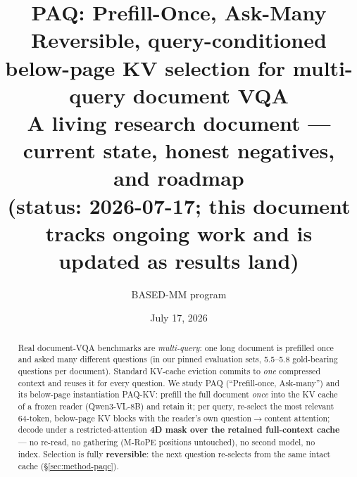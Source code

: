 \documentclass[11pt,letterpaper]{article}
\title{\textbf{PAQ: Prefill-Once, Ask-Many}\\[2mm]
\large Reversible, query-conditioned below-page KV selection for multi-query document VQA\\[1mm]
\normalsize A living research document --- current state, honest negatives, and roadmap\\[1mm]
\small (status: 2026-07-17; this document tracks ongoing work and is updated as results land)}
\author{BASED-MM program}
\date{July 17, 2026}
\newcommand{\paq}{\textsc{PAQ}}
\newcommand{\paqc}{\textsc{PAQ-KV}}
\begin{document}
\maketitle

\begin{abstract}
\noindent
Real document-VQA benchmarks are \emph{multi-query}: one long document is prefilled once and
asked many different questions (in our pinned evaluation sets, 5.5--5.8 gold-bearing questions
per document). Standard KV-cache eviction commits to \emph{one} compressed context and reuses it
for every question. We study \paq{} (``Prefill-once, Ask-many'') and its below-page
instantiation \paqc{}: prefill the full document \emph{once} into the KV cache of a frozen
reader (Qwen3-VL-8B) and retain it; per query, re-select the most relevant 64-token,
below-page KV blocks with the reader's own question$\to$content attention; decode under a
restricted-attention \textbf{4D mask over the retained full-context cache} --- no re-read, no
gathering (M-RoPE positions untouched), no second model, no index. Selection is fully
\textbf{reversible}: the next question re-selects from the same intact cache
(\S\ref{sec:method-paqc}).


\end{abstract}
\end{document}
